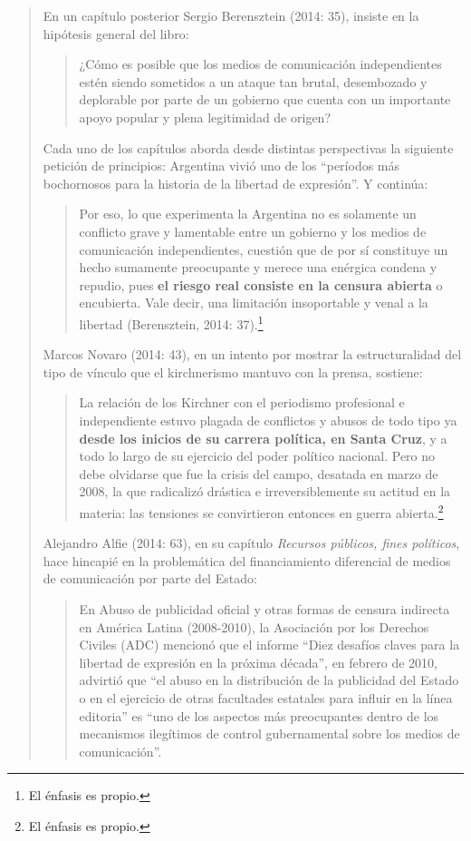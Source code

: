 \begin{quote}
En un capítulo posterior Sergio Berensztein (2014: 35), insiste en la hipótesis general del libro:

\begin{quote}
	¿Cómo es posible que los medios de comunicación independientes estén siendo sometidos a un ataque tan brutal, desembozado y deplorable por parte de un gobierno que cuenta con un importante apoyo popular y plena legitimidad de origen?
\end{quote}


Cada uno de los capítulos aborda desde distintas perspectivas la siguiente petición de principios: Argentina vivió uno de los \enquote{períodos más bochornosos para la historia de la libertad de expresión}. Y continúa:

\begin{quote}
	Por eso, lo que experimenta la Argentina no es solamente un conflicto grave y lamentable entre un gobierno y los medios de comunicación independientes, cuestión que de por sí constituye un hecho sumamente preocupante y merece una enérgica condena y repudio, pues \textbf{el riesgo real consiste en la censura abierta} o encubierta. Vale decir, una limitación insoportable y venal a la libertad (Berensztein, 2014: 37).\footnote{El énfasis es propio.}
\end{quote}


Marcos Novaro (2014: 43), en un intento por mostrar la estructuralidad del tipo de vínculo que el kirchnerismo mantuvo con la prensa, sostiene:

\begin{quote}
	La relación de los Kirchner con el periodismo profesional e independiente estuvo plagada de conflictos y abusos de todo tipo ya \textbf{desde los inicios de su carrera política, en Santa Cruz}, y a todo lo largo de su ejercicio del poder político nacional. Pero no debe olvidarse que fue la crisis del campo, desatada en marzo de 2008, la que radicalizó drástica e irreversiblemente su actitud en la materia: las tensiones se convirtieron entonces en guerra abierta.\footnote{El énfasis es propio.}
\end{quote}


Alejandro Alfie (2014: 63), en su capítulo \emph{Recursos públicos, fines políticos}, hace hincapié en la problemática del financiamiento diferencial de medios de comunicación por parte del Estado:

\begin{quote}
	En Abuso de publicidad oficial y otras formas de censura indirecta en América Latina (2008-2010), la Asociación por los Derechos Civiles (ADC) mencionó que el informe \enquote{Diez desafíos claves para la libertad de expresión en la próxima década}, en febrero de 2010, advirtió que \enquote{el abuso en la distribución de la publicidad del Estado o en el ejercicio de otras facultades estatales para influir en la línea editoria} es \enquote{uno de los aspectos más preocupantes dentro de los mecanismos ilegítimos de control gubernamental sobre los medios de comunicación}.
\end{quote}



\end{quote}
